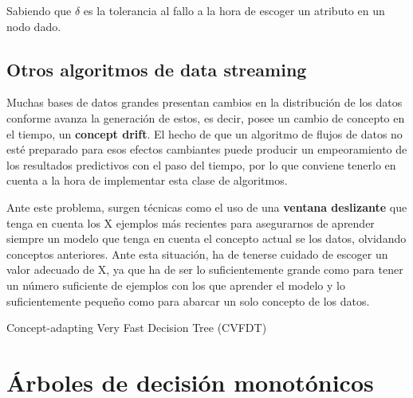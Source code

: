 Sabiendo que $\delta$ es la tolerancia al fallo a la hora de escoger un atributo en un nodo dado.

\subsection{Otros algoritmos de data streaming}

Muchas bases de datos grandes presentan cambios en la distribución de los datos conforme avanza la generación de estos, es decir, posee un cambio de concepto en el tiempo, un \textbf{concept drift}. El hecho de que un algoritmo de flujos de datos no esté preparado para esos efectos cambiantes puede producir un empeoramiento de los resultados predictivos con el paso del tiempo, por lo que conviene tenerlo en cuenta a la hora de implementar esta clase de algoritmos.

Ante este problema, surgen técnicas como el uso de una \textbf{ventana deslizante} que tenga en cuenta los X ejemplos más recientes para asegurarnos de aprender siempre un modelo que tenga en cuenta el concepto actual se los datos, olvidando conceptos anteriores. Ante esta situación, ha de tenerse cuidado de escoger un valor adecuado de X, ya que ha de ser lo suficientemente grande como para tener un número suficiente de ejemplos con los que aprender el modelo y lo suficientemente pequeño como para abarcar un solo concepto de los datos.

Concept-adapting Very Fast Decision Tree (CVFDT)

\section{Árboles de decisión monotónicos}


\newpage


